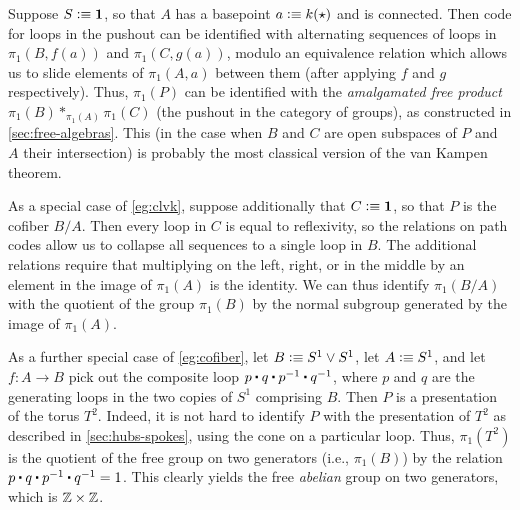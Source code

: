 \begin{eg}\label{eg:clvk}
  Suppose $S\vcentcolon\equiv \mathbf{1}$, so that $A$ has a basepoint $a \vcentcolon\equiv k(\star)$ and is connected.
  Then code for loops in the pushout can be identified with alternating sequences of loops in $\pi_1(B,f(a))$ and $\pi_1(C,g(a))$, modulo an equivalence relation which allows us to slide elements of $\pi_1(A,a)$ between them (after applying $f$ and $g$ respectively).
  Thus, $\pi_1(P)$ can be identified with the \emph{amalgamated free product}
  $\pi_1(B) *_{\pi_1(A)} \pi_1(C)$ (the pushout in the category of groups), as constructed in \cref{sec:free-algebras}.
  This (in the case when $B$ and $C$ are open subspaces of $P$ and $A$ their intersection) is probably the most classical version of the van Kampen theorem.
\end{eg}

\begin{eg}\label{eg:cofiber}
  As a special case of \cref{eg:clvk}, suppose additionally that $C\vcentcolon\equiv\mathbf{1}$, so that $P$ is the cofiber $B/A$.
  Then every loop in $C$ is equal to reflexivity, so the relations on path codes allow us to collapse all sequences to a single loop in $B$.
  The additional relations require that multiplying on the left, right, or in the middle by an element in the image of $\pi_1(A)$ is the identity.
  We can thus identify $\pi_1(B/A)$ with the quotient of the group $\pi_1(B)$ by the normal subgroup generated by the image of $\pi_1(A)$.
\end{eg}

\begin{eg}\label{eg:torus}
  As a further special case of \cref{eg:cofiber}, let $B\vcentcolon\equiv S^1 \vee S^1$, let $A\vcentcolon\equiv S^1$, and let $f:A\to B$ pick out the composite loop $p \ct q \ct \opp p \ct \opp q$, where $p$ and $q$ are the generating loops in the two copies of $S^1$ comprising $B$.
  Then $P$ is a presentation of the torus $T^2$.
  Indeed, it is not hard to identify $P$ with the presentation of $T^2$ as described in \cref{sec:hubs-spokes}, using the cone on a particular loop.
  Thus, $\pi_1(T^2)$ is the quotient of the free group on two generators (i.e., $\pi_1(B)$) by the relation $p \ct q \ct \opp p \ct \opp q = 1$.
  This clearly yields the free \emph{abelian} group on two generators, which is $\mathbb{Z}\times\mathbb{Z}$.
\end{eg}


